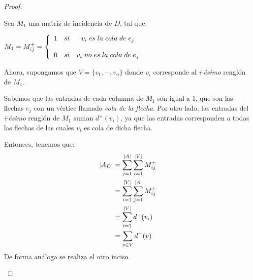 \documentclass{article}
\begin{document}
\begin{enumerate}
\begin{proof}
\begin{itemize}
          Sea $M_{1}$ una matriz de incidencia de $D$, tal que:
          \begin{center}
            $M_{1} = M^{+}_{ij}
            = \left \{
            \begin{array}{lcc}
              1 &   si  & v_{i} \hspace{0.3em} es \hspace{0.3em} la
              \hspace{0.3em} cola \hspace{0.3em} de \hspace{0.3em} e_{j} \\
              \\0 &  si & v_{i} \hspace{0.3em} no \hspace{0.3em} es \hspace{0.3em}
              la \hspace{0.3em} cola \hspace{0.3em} de \hspace{0.3em} e_{j}
            \end{array}
            \right.$
          \end{center}
          Ahora, supongamos que $V = \{v_{1}, \dotsm, v_{n}\}$ donde $v_{i}$
          corresponde al \textit{i-ésimo} renglón de $M_{1}$.

          Sabemos que las entradas de cada columna de $M_{1}$ son igual a 1,
          que son las flechas $e_{j}$ con un vértice llamado \textit{cola de la flecha}.
          Por otro lado, las entradas del \textit{i-ésimo} renglón de $M_{1}$
          suman $d^{+}(v_{i})$, ya que las entradas corresponden a todas las
          flechas de las cuales $v_{i}$ es cola de dicha flecha.

          Entonces, tenemos que:
          \begin{equation*}
            \begin{split}
              \abs{A_{D}} & = \sum_{j=1}^{\abs{A}} \sum_{i=1}^{\abs{V}} M^{+}_{ij} \\
              & = \sum_{i=1}^{\abs{V}} \sum_{j=1}^{\abs{A}} M^{+}_{ij} \\
              & = \sum_{i=1}^{\abs{V}} d^{+}(v_{i}) \\
              & = \sum_{v \in V} d^{+}(v)
            \end{split}
          \end{equation*}
          De forma análoga se realiza el otro inciso.


\end{itemize}
\end{proof}
\end{enumerate}
\end{document}
